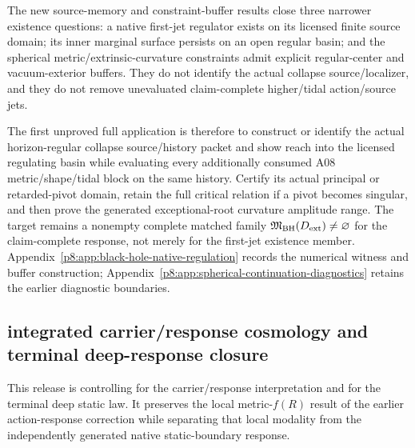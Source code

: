 \documentclass[12pt,a4paper]{article}
\begin{document}
The new source-memory and constraint-buffer results close three narrower
existence questions: a native first-jet regulator exists on its licensed
finite source domain; its inner marginal surface persists on an open regular
basin; and the spherical metric/extrinsic-curvature constraints admit explicit
regular-center and vacuum-exterior buffers.  They do not identify the actual
collapse source/localizer, and they do not remove unevaluated claim-complete
higher/tidal action/source jets.

The first unproved full application is therefore to construct or identify the
actual horizon-regular collapse source/history packet and show reach into the
licensed regulating basin while evaluating every additionally consumed A08
metric/shape/tidal block on the same history.  Certify its actual principal or
retarded-pivot domain, retain the full critical relation if a pivot becomes
singular, and then prove the generated exceptional-root curvature amplitude
range.  The target remains a nonempty complete matched family
\(\mathfrak M_{\rm BH}(D_{\rm ext})\ne\varnothing\) for the
claim-complete response, not merely for the first-jet existence member.
Appendix~\ref{p8:app:black-hole-native-regulation} records the numerical
witness and buffer construction; Appendix~\ref{p8:app:spherical-continuation-diagnostics}
retains the earlier diagnostic boundaries.





\subsection{integrated carrier/response cosmology and terminal deep-response closure}
\label{p8:sec:v295-integrated-corridor-deep-rar}

This release is controlling for the carrier/response interpretation and for
the terminal deep static law.  It preserves the local metric-$f(R)$ result of
the earlier action-response correction while separating that local modality
from the independently generated native static-boundary response.

\end{document}

